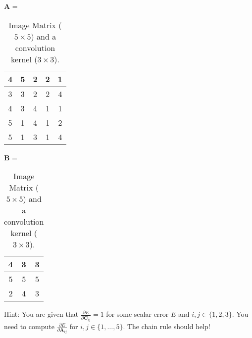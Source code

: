 \documentclass[11pt]{article}
\newcommand{\0}{\mat{0}}
\newcommand{\matr}[1]{\bm{#1}}     %
\begin{document}
 
\begin{table}[!ht]
    \centering
    $\matr{A}$ =  \begin{tabular}{|c|c|c|c|c|} 
    \hline
       4 & 5 & 2 & 2 & 1 \\ \hline 
       3 & 3 & 2 & 2 & 4 \\ \hline
       4 & 3 & 4 & 1 & 1 \\ \hline 
       5 & 1 & 4 & 1 & 2 \\ \hline
       5 & 1 & 3 & 1 & 4 \\ \hline
    \end{tabular}\hspace{1cm}
    $\matr{B}$ = \begin{tabular}{|c|c|c|} 
    \hline
       4 & 3 & 3 \\ \hline 
       5 & 5 & 5 \\ \hline
       2 & 4 & 3 \\ \hline 
    \end{tabular}
    \caption{Image Matrix ($5\times 5$) and a convolution kernel ($3\times 3$).}\label{tab1}   
\end{table}

 Hint: You are given that $\frac{\partial E}{\partial \matr{C}_{ij}} = 1$ for some scalar error $E$ and $i,j\in\{1,2,3\}$. You need to compute $\frac{\partial E}{\partial \matr{A}_{ij}}$ for  $i,j\in\{1, \ldots, 5\}$. The chain rule should help!
\newpage
\end{document}

